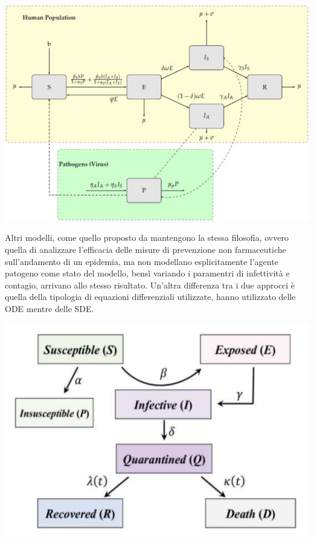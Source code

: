 \begin{minipage}{\linewidth}
    \centering
    \includegraphics[width=\textwidth]{img/13104_2020_5192_Fig1_HTML.png}
    \label{fig:SEIR_model_social_distancing}
\end{minipage}

Altri modelli, come quello proposto da \cite{ijerph17103535} mantengono 
la stessa filosofia, ovvero quella di analizzare l'efficacia delle misure 
di prevenzione non farmaceutiche sull'andamento di un epidemia, ma non
modellano esplicitamente l'agente patogeno come stato del modello, bensì
variando i paramentri di infettività e contagio, arrivano allo stesso 
risultato. Un'altra differenza tra i due approcci è quella della tipologia
di equazioni differenziali utilizzate, \cite{Mwalili2020} hanno utilizzato 
delle ODE mentre \cite{ijerph17103535} delle SDE.

\begin{minipage}{\linewidth}
    \centering
    \includegraphics[width=\textwidth]{img/ijerph-17-03535-g001.png}
    \label{fig:SEIR_model_article}
\end{minipage}

